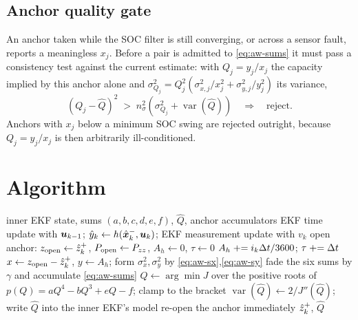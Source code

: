 \subsection{Anchor quality gate}
An anchor taken while the SOC filter is still converging, or across a sensor fault, reports a
meaningless $x_j$.  Before a pair is admitted to \eqref{eq:aw-sums} it must pass a consistency test
against the current estimate: with $Q_j=y_j/x_j$ the capacity implied by this anchor alone and
$\sigma_{Q_j}^2=Q_j^2\left(\sigma_{x,j}^2/x_j^2+\sigma_{y,j}^2/y_j^2\right)$ its variance,
\begin{equation}
\left(Q_j-\hat Q\right)^2 \;>\; n_\sigma^2\left(\sigma_{Q_j}^2+\operatorname{var}(\hat Q)\right)
\quad\Longrightarrow\quad\text{reject.}
\label{eq:aw-gate}
\end{equation}
Anchors with $x_j$ below a minimum SOC swing are rejected outright, because
$Q_j=y_j/x_j$ is then arbitrarily ill-conditioned.

\section{Algorithm}
\begin{algorithm}[H]
\caption{AWTLS capacity estimation --- one sampling period, and one anchor every $T$}
\begin{algorithmic}[1]
\Require inner EKF state, sums $(a,b,c,d,e,f)$, $\hat Q$, anchor accumulators
\State EKF time update with $\bm{u}_{k-1}$; $\hat y_k\gets h(\hat{\bm{x}}^{-}_k,\bm{u}_k)$; EKF measurement update with $v_k$
 open anchor: $z_\text{open}\gets\hat{z}^+_k$, $P_\text{open}\gets P_{zz}$, $A_h\gets0$, $\tau\gets0$
\EndIf
{}
   \State $A_h\mathrel{+}=i_k\Delta t/3600$; \quad $\tau\mathrel{+}=\Delta t$
      \State $x\gets z_\text{open}-\hat{z}^+_k$, \quad $y\gets A_h$; form $\sigma_x^2,\sigma_y^2$ by \eqref{eq:aw-sx},\eqref{eq:aw-sy}
         \State fade the six sums by $\gamma$ and accumulate \eqref{eq:aw-sums}
         \State $\hat Q\gets\arg\min J$ over the positive roots of $p(Q)=aQ^4-bQ^3+eQ-f$; clamp to the bracket
         \State $\operatorname{var}(\hat Q)\gets 2/J''(\hat Q)$; write $\hat Q$ into the inner EKF's model
      \EndIf
      \State re-open the anchor immediately
   \EndIf
\EndIf
\Ensure $\hat{z}^+_k$, $\hat Q$
\end{algorithmic}
\end{algorithm}

